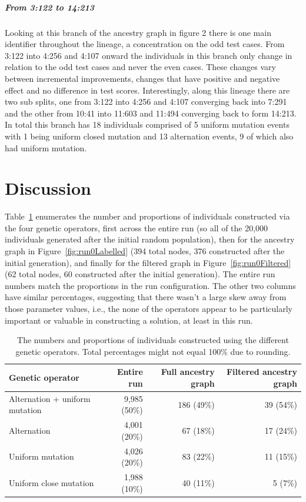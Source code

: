 \subparagraph{From 3:122 to 14:213}
Looking at this branch of the ancestry graph in figure 2 there is one main identifier
throughout the lineage, a concentration on the odd test cases. From 3:122 into 4:256 and 4:107
onward the individuals in this branch only change in relation to the odd test cases and never
the even cases. These changes vary between incremental improvements, changes that have positive
and negative effect and no difference in test scores. Interestingly, along this lineage there are
two sub splits, one from 3:122 into 4:256 and 4:107 converging back into 7:291 and the other from
10:41 into 11:603 and 11:494 converging back to form 14:213. In total this branch has 18 
individuals comprised of 5 uniform mutation events with 1 being uniform closed mutation and 
13 alternation events, 9 of which also had uniform mutation.

\section{Discussion}
\label{sec:discussion}


Table~\ref{tab:operatorCounts} enumerates the number and proportions 
of individuals constructed via the four genetic operators, first across the
entire run (so all of the 20,000 individuals generated after the initial
random population), then for the ancestry graph in 
Figure~\ref{fig:run0Labelled} (394 total nodes, 
376 constructed after the initial generation), and finally for the filtered
graph in Figure~\ref{fig:run0Filtered} (62 total nodes, 60 constructed after 
the initial generation). The entire run numbers match the proportions
in the run configuration. The other two columns have similar percentages,
suggesting that there wasn't a large skew away from those parameter values,
i.e., the none of the operators appear to be particularly important or
valuable in constructing a solution, at least in this run.

\begin{table}[t]
	\begin{tabular}{lrrr}
		\textbf{Genetic operator} & \textbf{Entire run} & \; \textbf{Full ancestry graph} & \; \textbf{Filtered ancestry graph} \\ 
		\hline
		Alternation + uniform mutation & 9,985 (50\%) & 186 (49\%) & 39 (54\%) \\ 
		Alternation & 4,001 (20\%) & 67 (18\%) & 17 (24\%) \\ 
		Uniform mutation & 4,026 (20\%) & 83 (22\%) & 11 (15\%) \\ 
		Uniform close mutation & 1,988 (10\%) & 40 (11\%) & 5 (7\%)
	\end{tabular} 
	\caption{The numbers and proportions of individuals constructed using
		the different genetic operators. Total percentages might not equal 100\% due to rounding.}
	\label{tab:operatorCounts}
\end{table}

